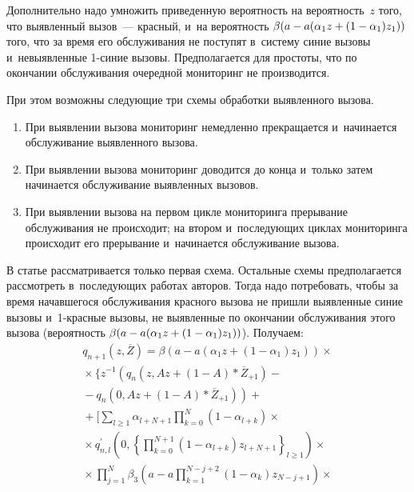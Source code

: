 \begin{multicols}{2}
  Дополнительно надо умножить приведенную вероятность на 
вероятность~$z$ того, что выявленный вызов~--- красный, и~на вероятность 
$\beta(a\hm- a(\alpha_1z\hm+ (1\hm- \alpha_1)z_1))$ того, что за время его 
обслуживания не поступят в~систему синие вызовы и~невыявленные 1-си\-ние 
вызовы. Предполагается для простоты, что по окончании обслуживания 
очередной мониторинг не производится.
  
  При этом возможны следующие три схемы обработки выявленного вызова.
  \begin{enumerate}[1.]
  \item При выявлении вызова мониторинг немедленно прекращается 
и~начинается обслуживание выявленного вызова.
  \item При выявлении вызова мониторинг доводится до конца и~только затем 
начинается обслуживание выявленных вызовов.
  \item При выявлении вызова на первом цикле мониторинга прерывание 
обслуживания не происходит; на втором и~последующих циклах мониторинга 
происходит его прерывание и~начинается обслуживание вызова.
  \end{enumerate}
  
  В статье рассматривается только первая схема. Остальные схемы 
предполагается рассмотреть в~после\-ду\-ющих работах авторов. Тогда надо 
потребовать, чтобы за время начавшегося обслуживания красного вызова не 
пришли выявленные синие вызовы и~1-крас\-ные вызовы, не выявленные по 
окончании обслуживания этого вызова (вероятность $\beta(a\hm- 
a(\alpha_1z\hm+(1\hm- \alpha_1)z_1))$). Получаем:
  \begin{multline*}
  q_{n+1} \left(z,\overline{Z}\right) =
  \beta\left(a-a\left( \alpha_1 z+\left( 1-
\alpha_1\right) z_1\right)\right)\times{}\\
{}\times
  \Bigg\{ z^{-1} \left( q_n \left(z, Az+(1-A)*\overline{Z}_{+1}\right)\right.-{}\\
  \left.{}-
  q_n\left(0,Az+(1-A)*\overline{Z}_{+1}\right)\right)+{}\\
  {}+\Bigg[
  \sum\limits_{l\geq1} \alpha_{l+N+1}\prod\limits^N_{k=0} \left(1-
\alpha_{l+k}\right)\times{} \\
  {}\times
  q^\prime_{n,l} \left(0, \left\{ \prod\limits_{k=0}^{N+1} \left(1-
\alpha_{l+k}\right) z_{l+N+1}\right\}_{l\geq1}\right) \times{}\\
{}\times \prod\limits^N_{j=1} \beta_3 
\left( a-a\prod\limits_{k=1}^{N-j+2}\left( 1-\alpha_k\right) z_{N-j+1}\right)\times{}
  \end{multline*}
  

\end{multicols}
